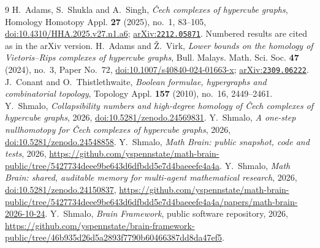 \documentclass[11pt]{amsart}
\theoremstyle{remark}
\newcommand{\arxiv}[1]{\href{https://arxiv.org/abs/#1}{arXiv:\nolinkurl{#1}}}
\begin{document}
\begin{thebibliography}{9}
 H.~Adams, S.~Shukla and A.~Singh, \emph{\v{C}ech complexes of hypercube graphs}, Homology Homotopy Appl.
\textbf{27} (2025), no.~1, 83--105, \href{https://doi.org/10.4310/HHA.2025.v27.n1.a6}{doi:10.4310/HHA.2025.v27.n1.a6};
\arxiv{2212.05871}. Numbered results are cited as in the arXiv version.
 H.~Adams and \v{Z}.~Virk, \emph{Lower bounds on the homology of Vietoris--Rips complexes of hypercube
graphs}, Bull. Malays. Math. Sci. Soc. \textbf{47} (2024), no.~3, Paper No.~72,
\href{https://doi.org/10.1007/s40840-024-01663-x}{doi:10.1007/s40840-024-01663-x}; \arxiv{2309.06222}.
 J.~Conant and O.~Thistlethwaite, \emph{Boolean formulae, hypergraphs and combinatorial topology}, Topology
Appl. \textbf{157} (2010), no.~16, 2449--2461.
 Y.~Shmalo, \emph{Collapsibility numbers and high-degree homology of \v{C}ech complexes of hypercube
graphs}, 2026, \href{https://doi.org/10.5281/zenodo.24569831}{doi:10.5281/zenodo.24569831}.
 Y.~Shmalo, \emph{A one-step nullhomotopy for \v{C}ech complexes of hypercube graphs}, 2026,
\href{https://doi.org/10.5281/zenodo.24548858}{doi:10.5281/zenodo.24548858}.
 Y.~Shmalo, \emph{Math Brain: public snapshot, code and tests}, 2026,
\url{https://github.com/yspennstate/math-brain-public/tree/5427734deee9be643d6dfbdd5e7d4baeeefe4a4a}.
 Y.~Shmalo, \emph{Math Brain: shared, auditable memory for multi-agent mathematical
research}, 2026, \href{https://doi.org/10.5281/zenodo.24150837}{doi:10.5281/zenodo.24150837},
\url{https://github.com/yspennstate/math-brain-public/tree/5427734deee9be643d6dfbdd5e7d4baeeefe4a4a/papers/math-brain-2026-10-24}.
 Y.~Shmalo, \emph{Brain Framework}, public software repository, 2026,
\url{https://github.com/yspennstate/brain-framework-public/tree/46b935d26d5a2893f7790b60466387dd8da47ef5}.
\end{thebibliography}
\end{document}
